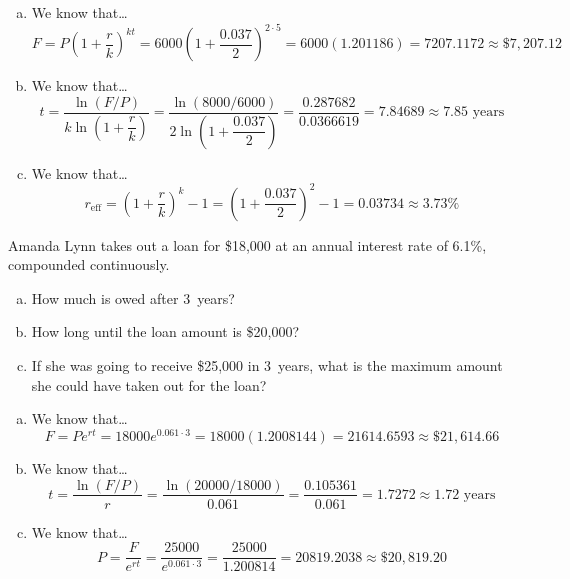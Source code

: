 \documentclass[11pt,letterpaper]{article}
\begin{document}
\sol
\begin{enumerate}[(a)]
\item We know that\dots
	\[
	F= P \left(1 + \dfrac{r}{k} \right)^{kt}= 6000 \left(1 + \dfrac{0.037}{2} \right)^{2 \cdot 5}= 6000 (1.201186)= 7207.1172 \approx \$7,207.12
	\] \pspace

\item We know that\dots
	\[
	t= \dfrac{\ln(F/P)}{k \ln \left( 1 + \dfrac{r}{k} \right)}= \dfrac{\ln(8000/6000)}{2 \ln \left( 1 + \dfrac{0.037}{2} \right)}= \dfrac{0.287682}{0.0366619}= 7.84689 \approx 7.85 \text{ years}
	\] \pspace

\item We know that\dots
	\[
	r_{\text{eff}}= \left( 1 + \dfrac{r}{k} \right)^k - 1= \left( 1 + \dfrac{0.037}{2} \right)^2 - 1= 0.03734 \approx 3.73\%
	\]
\end{enumerate}



\newpage



 Amanda Lynn takes out a loan for \$18,000 at an annual interest rate of 6.1\%, compounded continuously. 
	\begin{enumerate}[(a)]
	\item How much is owed after 3~years?
	\item How long until the loan amount is \$20,000?
	\item If she was going to receive \$25,000 in 3~years, what is the maximum amount she could have taken out for the loan?
	\end{enumerate} \pspace

\sol
\begin{enumerate}[(a)]
\item We know that\dots
	\[
	F= P e^{rt}= 18000 e^{0.061 \cdot 3}= 18000 (1.2008144)= 21614.6593 \approx \$21,614.66
	\] \pspace

\item We know that\dots
	\[
	t= \dfrac{\ln(F/P)}{r}= \dfrac{\ln(20000/18000)}{0.061}= \dfrac{0.105361}{0.061}= 1.7272 \approx 1.72 \text{ years}
	\] \pspace

\item We know that\dots
	\[
	P= \dfrac{F}{e^{rt}}= \dfrac{25000}{e^{0.061 \cdot 3}}= \dfrac{25000}{1.200814}= 20819.2038 \approx \$20,819.20
	\]
\end{enumerate}



\newpage
\end{document}
